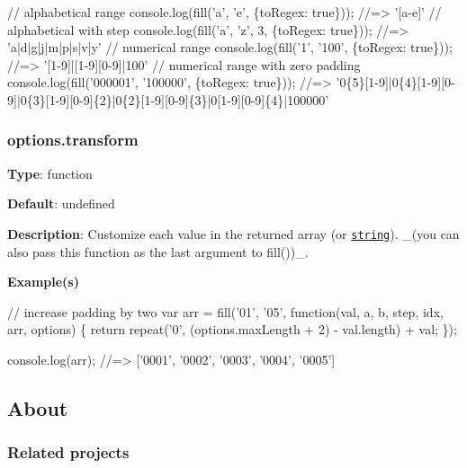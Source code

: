\begin{DoxyCode}
// alphabetical range
console.log(fill('a', 'e', \{toRegex: true\})); //=> '[a-e]'
// alphabetical with step
console.log(fill('a', 'z', 3, \{toRegex: true\})); //=> 'a|d|g|j|m|p|s|v|y'
// numerical range
console.log(fill('1', '100', \{toRegex: true\})); //=> '[1-9]|[1-9][0-9]|100'
// numerical range with zero padding
console.log(fill('000001', '100000', \{toRegex: true\}));
//=> '0\{5\}[1-9]|0\{4\}[1-9][0-9]|0\{3\}[1-9][0-9]\{2\}|0\{2\}[1-9][0-9]\{3\}|0[1-9][0-9]\{4\}|100000'
\end{DoxyCode}


\subsubsection*{options.\+transform}

{\bfseries Type}\+: {\ttfamily function}

{\bfseries Default}\+: {\ttfamily undefined}

{\bfseries Description}\+: Customize each value in the returned array (or \href{#optionstoRegex}{\tt string}). \+\_\+(you can also pass this function as the last argument to {\ttfamily fill()})\+\_\+.

{\bfseries Example(s)}


\begin{DoxyCode}
// increase padding by two
var arr = fill('01', '05', function(val, a, b, step, idx, arr, options) \{
  return repeat('0', (options.maxLength + 2) - val.length) + val;
\});

console.log(arr);
//=> ['0001', '0002', '0003', '0004', '0005']
\end{DoxyCode}


\subsection*{About}

\subsubsection*{Related projects}


